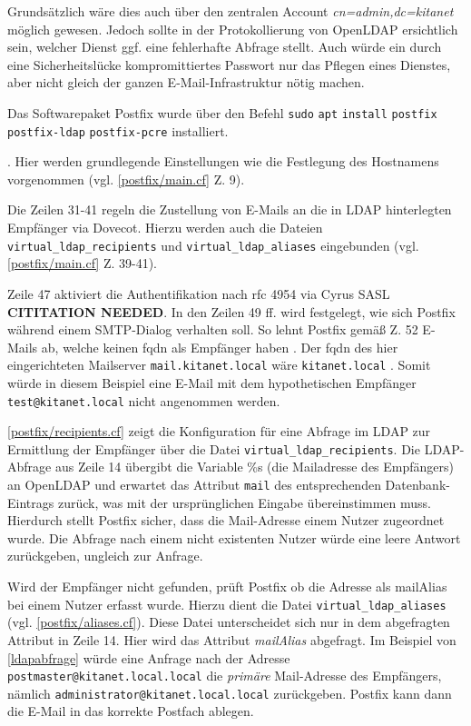 Grundsätzlich wäre dies auch über den zentralen Account \textit{cn=admin,dc=kitanet} möglich gewesen. 
Jedoch sollte in der Protokollierung von OpenLDAP ersichtlich sein, welcher Dienst ggf. eine fehlerhafte Abfrage stellt. 
Auch würde ein durch eine Sicherheitslücke kompromittiertes Passwort nur das Pflegen eines Dienstes, aber nicht gleich der ganzen E-Mail-Infrastruktur nötig machen.

Das Softwarepaket Postfix wurde über den Befehl \verb+sudo+ \verb+apt+ \verb+install+ \verb+postfix+ \\ \verb+postfix-ldap+ \verb+postfix-pcre+ installiert. 

 \citep[][308]{Deimeke2019}.
Hier werden grundlegende Einstellungen wie die Festlegung des Hostnamens vorgenommen (vgl. \autoref{postfix/main.cf} Z. 9).

Die Zeilen 31-41 regeln die Zustellung von E-Mails an die in LDAP hinterlegten Empfänger via Dovecot. Hierzu werden auch die  Dateien \verb+virtual_ldap_recipients+ und \verb+virtual_ldap_aliases+ eingebunden (vgl. \autoref{postfix/main.cf} Z. 39-41).

Zeile 47 aktiviert die Authentifikation nach \ac{rfc} 4954 via Cyrus SASL \textbf{CITITATION NEEDED}.
In den Zeilen 49 ff. wird festgelegt, wie sich Postfix während einem SMTP-Dialog verhalten soll.
So lehnt Postfix \zb gemäß Z. 52 E-Mails ab, welche keinen \ac{fqdn} als Empfänger haben \citep[vgl.][]{postfixfqdn}. 
Der \ac{fqdn} des hier eingerichteten Mailserver \verb+mail.kitanet.local+ wäre \zb \verb+kitanet.local+ \citep[vgl.][]{fqdn}. 
Somit würde in diesem Beispiel eine E-Mail mit dem hypothetischen Empfänger \verb+test@kitanet.local+ nicht angenommen werden.

\autoref{postfix/recipients.cf} zeigt die Konfiguration für eine Abfrage im LDAP zur Ermittlung der Empfänger über die Datei \verb+virtual_ldap_recipients+.
Die LDAP-Abfrage aus Zeile 14 übergibt die Variable \%s (die Mailadresse des Empfängers) an OpenLDAP und erwartet das Attribut \verb+mail+ des entsprechenden Datenbank-Eintrags zurück, was mit der ursprünglichen Eingabe übereinstimmen muss. Hierdurch stellt Postfix sicher, dass die Mail-Adresse einem Nutzer zugeordnet wurde. Die Abfrage nach einem nicht existenten Nutzer würde eine leere Antwort zurückgeben, ungleich zur Anfrage.

Wird der Empfänger nicht gefunden, prüft Postfix ob die Adresse als mailAlias bei einem Nutzer erfasst wurde. Hierzu dient die Datei \verb+virtual_ldap_aliases+ (vgl. \autoref{postfix/aliases.cf}). 
Diese Datei unterscheidet sich nur in dem abgefragten Attribut in Zeile 14. 
Hier wird das Attribut \textit{mailAlias} abgefragt. 
Im Beispiel von \autoref{ldapabfrage} würde eine Anfrage nach der Adresse \verb+postmaster@kitanet.local.local+ die \textit{primäre} Mail-Adresse des Empfängers, nämlich \verb+administrator@kitanet.local.local+ zurückgeben. 
Postfix kann dann die E-Mail in das korrekte Postfach ablegen.

